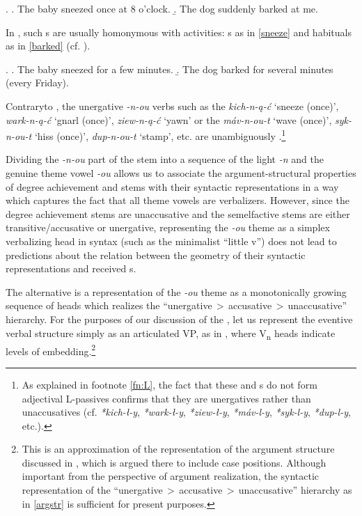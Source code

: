 \ex. 
\a. The baby sneezed once at 8 o'clock.  
\b. The dog suddenly barked at me.

In , such s are usually homonymous with activities: s as in \ref{sneeze} and habituals as in \ref{barked} (cf. \citealt{Carlson2012}).

\ex. 
\a. The baby sneezed for a few minutes.\label{sneeze}
\b. The dog barked for several minutes (every Friday).\label{barked}

Contrary\largerpage to , the unergative \textit{-n-ou} verbs such as the  \textit{kich-n-\k{a}-\'c} `sneeze (once)', \textit{wark-n-\k{a}-\'c} `gnarl (once)', \textit{ziew-n-\k{a}-\'c} `yawn' or the  \textit{m\'av-n-ou-t}  `wave (once)', \textit{syk-n-ou-t} `hiss (once)', \textit{dup-n-ou-t} `stamp', etc. are unambiguously .\footnote{As explained in footnote \ref{fn:L}, the fact that these  and  s do not form adjectival L-passives confirms that they are unergatives rather than unaccusatives (cf. \textit{*kich-\l-y}, \textit{*wark-\l-y}, \textit{*ziew-\l-y}, \textit{*m\'av-l-y}, \textit{*syk-l-y}, \textit{*dup-l-y}, etc.).
} %
\par
Dividing the \textit{-n-ou} part of the stem into a sequence of the light \textit{-n} and the genuine theme vowel \textit{-ou} allows us to associate the argument-structural properties of degree achievement and   stems with their syntactic representations in a way which captures the fact that all theme vowels are verbalizers.  However, since the degree achievement stems are unaccusative and the semelfactive stems are either transitive/accusative or unergative, representing the \textit{-ou} theme as a simplex verbalizing head in syntax (such as the minimalist ``little v'') does not lead to predictions about the relation between the geometry of their syntactic representations and received s.
\par
The alternative is a representation of the \textit{-ou} theme as a monotonically growing sequence of heads which realizes the ``unergative\,$>$\,accusative\,$>$\,unaccusa\-tive'' hierarchy. For the purposes of our discussion of the , let us represent the eventive verbal structure simply as an articulated VP, as in \Next, where V\textsubscript{n} heads indicate levels of embedding.\footnote{This is an approximation of the representation of the argument structure discussed in \cite{NU}, which is argued there to include case positions. Although important from the perspective of argument realization, the syntactic representation of the ``unergative\,$>$\,accusative\,$>$\,unaccusative'' hierarchy as in \ref{argstr} is sufficient for present purposes. 
} %


